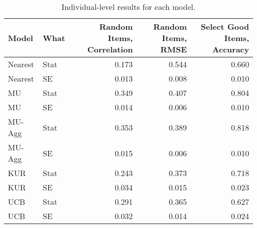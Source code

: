 \begin{table}[ht]
\centering
\begin{tabular}{llrrr}
  \toprule
Model & What & Random Items, Correlation & Random Items, RMSE & Select Good Items, Accuracy \\ 
  \midrule
Nearest & Stat & 0.173 & 0.544 & 0.660 \\ 
  Nearest & SE & 0.013 & 0.008 & 0.010 \\ 
  MU & Stat & 0.349 & 0.407 & 0.804 \\ 
  MU & SE & 0.014 & 0.006 & 0.010 \\ 
  MU-Agg & Stat & 0.353 & 0.389 & 0.818 \\ 
  MU-Agg & SE & 0.015 & 0.006 & 0.010 \\ 
  KUR & Stat & 0.243 & 0.373 & 0.718 \\ 
  KUR & SE & 0.034 & 0.015 & 0.023 \\ 
  UCB & Stat & 0.291 & 0.365 & 0.627 \\ 
  UCB & SE & 0.032 & 0.014 & 0.024 \\ 
   \bottomrule
\end{tabular}
\caption{Individual-level results for each model.} 
\end{table}
